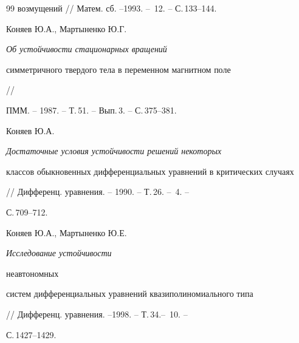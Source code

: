 \begin{thebibliography}{99}
{возмущений} // Матем. сб. --1993. -- \No\,12. -- С.\,133--144. 




Коняев Ю.А., Мартыненко Ю.Г. {\em Об устойчивости стационарных вращений 


симметричного твердого тела в переменном магнитном поле} // 


ПММ. -- 1987. -- Т.\,51. -- Вып.\,3. -- С.\,375--381. 




Коняев Ю.А. {\em Достаточные условия устойчивости решений некоторых  


классов обыкновенных дифференциальных уравнений в критических случаях} 


// Дифференц. уравнения. -- 1990. -- Т.\,26. -- \No\,4. -- 


С.\,709--712. 




Коняев Ю.А., Мартыненко Ю.Е. {\em Исследование устойчивости 


неавтономных 


систем дифференциальных уравнений квазиполиномиального типа} 


// Дифференц. уравнения. --1998. -- Т.\,34.-- \No\,10. -- 


С.\,1427--1429.  


 


\end{thebibliography} 


\vskip 2cm 






\label{end}  


  


 





